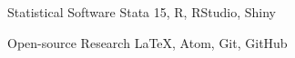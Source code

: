 

\begin{cvskills}

  \cvskill
    {Statistical Software} %
    {Stata 15, R, RStudio, Shiny} %

  \cvskill
    {Open-source Research} %
    {LaTeX, Atom, Git, GitHub} %
\end{cvskills}
